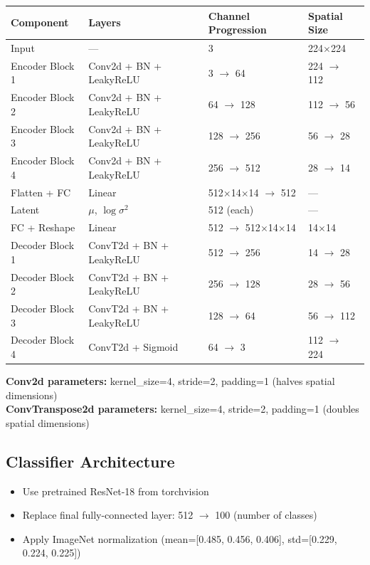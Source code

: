 \documentclass[11pt,a4paper]{article}
\begin{document}
\begin{center}
\begin{tabular}{@{}llll@{}}
\toprule
\textbf{Component} & \textbf{Layers} & \textbf{Channel Progression} & \textbf{Spatial Size} \\
\midrule
Input & --- & 3 & 224$\times$224 \\
Encoder Block 1 & Conv2d + BN + LeakyReLU & 3 $\rightarrow$ 64 & 224 $\rightarrow$ 112 \\
Encoder Block 2 & Conv2d + BN + LeakyReLU & 64 $\rightarrow$ 128 & 112 $\rightarrow$ 56 \\
Encoder Block 3 & Conv2d + BN + LeakyReLU & 128 $\rightarrow$ 256 & 56 $\rightarrow$ 28 \\
Encoder Block 4 & Conv2d + BN + LeakyReLU & 256 $\rightarrow$ 512 & 28 $\rightarrow$ 14 \\
\midrule
Flatten + FC & Linear & 512$\times$14$\times$14 $\rightarrow$ 512 & --- \\
Latent & $\mu$, $\log\sigma^2$ & 512 (each) & --- \\
\midrule
FC + Reshape & Linear & 512 $\rightarrow$ 512$\times$14$\times$14 & 14$\times$14 \\
Decoder Block 1 & ConvT2d + BN + LeakyReLU & 512 $\rightarrow$ 256 & 14 $\rightarrow$ 28 \\
Decoder Block 2 & ConvT2d + BN + LeakyReLU & 256 $\rightarrow$ 128 & 28 $\rightarrow$ 56 \\
Decoder Block 3 & ConvT2d + BN + LeakyReLU & 128 $\rightarrow$ 64 & 56 $\rightarrow$ 112 \\
Decoder Block 4 & ConvT2d + Sigmoid & 64 $\rightarrow$ 3 & 112 $\rightarrow$ 224 \\
\bottomrule
\end{tabular}
\end{center}

\textbf{Conv2d parameters:} kernel\_size=4, stride=2, padding=1 (halves spatial dimensions)\\
\textbf{ConvTranspose2d parameters:} kernel\_size=4, stride=2, padding=1 (doubles spatial dimensions)

\subsection{Classifier Architecture}
\begin{itemize}[noitemsep]
    \item Use pretrained ResNet-18 from torchvision
    \item Replace final fully-connected layer: 512 $\rightarrow$ 100 (number of classes)
    \item Apply ImageNet normalization (mean=[0.485, 0.456, 0.406], std=[0.229, 0.224, 0.225])
\end{itemize}
\end{document}
